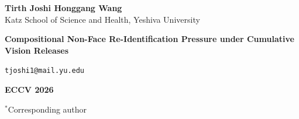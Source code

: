 \documentclass[final]{article}
\newcommand{\fsBody}{\fontsize{25}{29}}   %
\newcommand{\fsSmall}{\fontsize{20}{24}}  %
\begin{document}
\begin{minipage}[t]{\textwidth}
\begin{tcolorbox}[enhanced,colback=navy,colframe=navy,boxrule=0pt,arc=0in,outer arc=0in,left=0.264in,right=0.264in,top=0.03in,bottom=0.03in]
\begin{minipage}[c]{0.30\textwidth}
  {\fsBody\bfseries\color{white} Tirth Joshi \;\textcolor{lineblue}{\textbullet}\; Honggang Wang} \\
  {\fsSmall\selectfont\color{white}Katz School of Science and Health, Yeshiva University}
\end{minipage}\hfill
\begin{minipage}[c]{0.46\textwidth}
  \centering
  {\fsBody\bfseries\color{white} Compositional Non-Face Re-Identification Pressure under Cumulative Vision Releases}\par
  {\fsSmall\selectfont\color{white}\texttt{tjoshi1@mail.yu.edu}}
\end{minipage}\hfill
\begin{minipage}[c]{0.18\textwidth}
  \raggedleft
  {\fsBody\bfseries\color{white}ECCV 2026}\par
  {\fsSmall\selectfont\color{lineblue}$^{\ast}$Corresponding author}
\end{minipage}
\end{tcolorbox}

\end{minipage}
\end{document}
